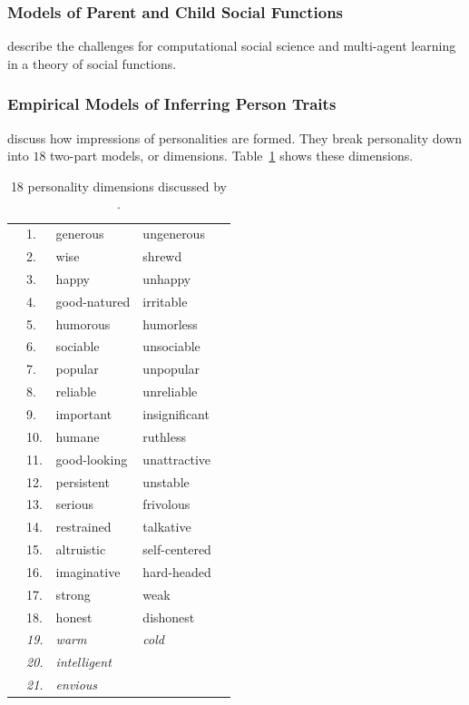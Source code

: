 \subsubsection{Models of Parent and Child Social Functions}
\cite{castelfranchi:2001} describe the challenges for computational social science and multi-agent learning in a theory of social functions.


\subsubsection{Empirical Models of Inferring Person Traits}

\cite{asch:2005} discuss how impressions of personalities are formed.
They break personality down into $18$ two-part models, or dimensions.
Table~\ref{tab:asch_personality_dimensions} shows these dimensions.

\begin{table}
  \myfloatalign
  \begin{tabularx}{\textwidth}{XlllX}
    & 1.         & generous           & ungenerous    & \\
    & 2.         & wise               & shrewd        & \\
    & 3.         & happy              & unhappy       & \\
    & 4.         & good-natured       & irritable     & \\
    & 5.         & humorous           & humorless     & \\
    & 6.         & sociable           & unsociable    & \\
    & 7.         & popular            & unpopular     & \\
    & 8.         & reliable           & unreliable    & \\
    & 9.         & important          & insignificant & \\
    & 10.        & humane             & ruthless      & \\
    & 11.        & good-looking       & unattractive  & \\
    & 12.        & persistent         & unstable      & \\
    & 13.        & serious            & frivolous     & \\
    & 14.        & restrained         & talkative     & \\
    & 15.        & altruistic         & self-centered & \\
    & 16.        & imaginative        & hard-headed   & \\
    & 17.        & strong             & weak          & \\
    & 18.        & honest             & dishonest     & \\
    & \emph{19.} & \emph{warm}        & \emph{cold}   & \\
    & \emph{20.} & \emph{intelligent} & ~             & \\
    & \emph{21.} & \emph{envious}     & ~             & 
  \end{tabularx}
  \caption[18 personality dimensions]{18 personality dimensions discussed by .}
  \label{tab:asch_personality_dimensions}
\end{table}


